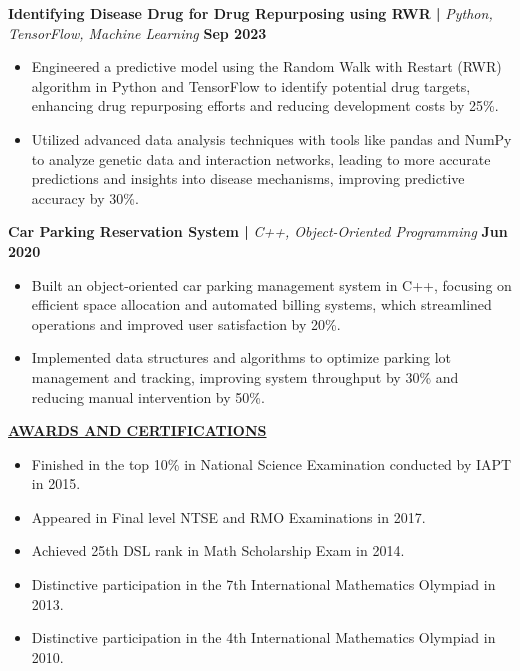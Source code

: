\documentclass{article}
\begin{document}
\vspace{1mm} 

\noindent \textbf{Identifying Disease Drug for Drug Repurposing using RWR | } \textit{Python, TensorFlow, Machine Learning} \hfill \textbf{Sep 2023}
\begin{itemize}[noitemsep,nolistsep,leftmargin=*]
\item {\small Engineered a predictive model using the Random Walk with Restart (RWR) algorithm in Python and TensorFlow to identify potential drug targets, enhancing drug repurposing efforts and reducing development costs by 25\%.}
\item {\small Utilized advanced data analysis techniques with tools like pandas and NumPy to analyze genetic data and interaction networks, leading to more accurate predictions and insights into disease mechanisms, improving predictive accuracy by 30\%.}
\end{itemize}

\vspace{1mm} 

\noindent \textbf{Car Parking Reservation System | } \textit{C++, Object-Oriented Programming} \hfill \textbf{Jun 2020}
\begin{itemize}[noitemsep,nolistsep,leftmargin=*]
\item {\small Built an object-oriented car parking management system in C++, focusing on efficient space allocation and automated billing systems, which streamlined operations and improved user satisfaction by 20\%.}
\item {\small Implemented data structures and algorithms to optimize parking lot management and tracking, improving system throughput by 30\% and reducing manual intervention by 50\%.}
\end{itemize}


\vspace{2mm} 
\noindent \textbf{\underline{AWARDS AND CERTIFICATIONS}} 
\begin{itemize}[noitemsep,nolistsep,leftmargin=*]
\item {\small Finished in the top 10\% in National Science Examination conducted by IAPT in 2015.}
\item {\small Appeared in Final level NTSE and RMO Examinations in 2017.}
\item {\small Achieved 25th DSL rank in Math Scholarship Exam in 2014.}
\item {\small Distinctive participation in the 7th International Mathematics Olympiad in 2013.}
\item {\small Distinctive participation in the 4th International Mathematics Olympiad in 2010.}
\end{itemize}

\end{document}
